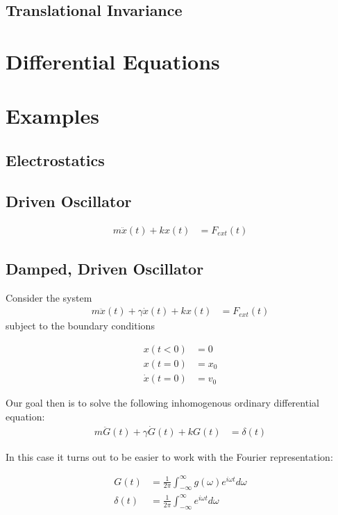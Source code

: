 \documentclass[11pt]{article}
\theoremstyle{plain}
\theoremstyle{definition}
\begin{document}
\subsection{Translational Invariance}

\section{Differential Equations}

\section{Examples}
\subsection{Electrostatics}
\subsection{Driven Oscillator}
\begin{align}
    m \ddot x(t) + kx(t) &= F_{ext}(t)
\end{align}


\subsection{Damped, Driven  Oscillator}

Consider the system
\begin{align}
    m \ddot x(t) + \gamma \dot x(t) + kx(t) &= F_{ext}(t) \label{eq:DDHO}
\end{align}
subject to the boundary conditions

\begin{align}
    x(t < 0) &= 0 \\
    x(t=0) &= x_0 \label{eq:X0}\\
    \dot x(t = 0) &= v_0 \label{eq:V0}
\end{align}

Our goal then is to solve the following inhomogenous ordinary differential equation:
\begin{align}
    m \ddot G(t) + \gamma \dot G(t) + kG(t) &= \delta(t) \label{eq:DDHOG}
\end{align}


In this case it turns out to be easier to work with the Fourier representation:

\begin{align}
    G(t) &= \frac{1}{2\pi} \int_{-\infty}^{\infty} g(\omega) e^{i\omega t} d\omega \label{eq:DDHOGF} \\
    \delta(t) &= \frac{1}{2\pi} \int_{-\infty}^{\infty} e^{i\omega t} d\omega \label{eq:DF}
\end{align}
\end{document}

